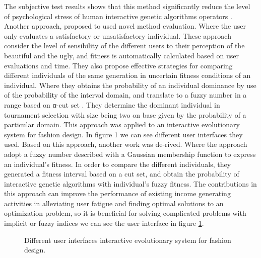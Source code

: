 The subjective test results shows that this method significantly reduce the
level of psychological stress of human interactive genetic algorithms operators
\cite{ohsaki1998input}. Another approach, proposed to used novel method
evaluation. Where the user only evaluates a satisfactory or unsatisfactory
individual. These approach consider the level of sensibility of the different
users to their perception of the beautiful and the ugly, and fitness is
automatically calculated based on user evaluations and time. They also propose
effective strategies for comparing different individuals of the same generation
in uncertain fitness conditions of an individual. Where they obtains the
probability of an individual dominance by use of the probability of the interval
domain, and translate to a fuzzy number in a range based on α-cut set
\cite{gong2009impact}. They determine the dominant individual in tournament
selection with size being two on base given by the probability of a particular
domain. This approach was applied to an interactive evolutionary system for
fashion design. In figure 1 we can see different user interfaces they used.
Based on this approach, another work was de-rived. Where the approach adopt a
fuzzy number described with a Gaussian membership function to express an
individual's fitness. In order to compare the different individuals, they
generated a fitness interval based on a cut set, and obtain the probability of
interactive genetic algorithms with individual's fuzzy fitness. The
contributions in this approach can improve the performance of existing income
generating activities in alleviating user fatigue and finding optimal solutions
to an optimization problem, so it is beneficial for solving complicated problems
with implicit or fuzzy indices \cite{gong2011interactive} we can see the user
interface in figure \ref{fig:fashion}.

\begin{figure}
\captionsetup{justification=centering,margin=2cm}
\centering
\setlength\fboxsep{0pt}
\setlength\fboxrule{0.7pt}
\caption{Different user interfaces interactive evolutionary system for fashion design.}
\label{fig:fashion}       
\end{figure}

